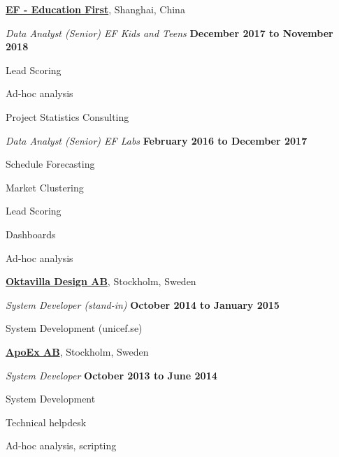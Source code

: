 \halfblankline

\href{http://www.ef.se}{\textbf{EF - Education First}}, Shanghai, China
\begin{outerlist}
\item[] \textit{Data Analyst (Senior) EF Kids and Teens}%
  \hfill \textbf{December 2017 to November 2018}
  \begin{innerlist}
  \item Lead Scoring
  \item Ad-hoc analysis
  \item Project Statistics Consulting
  \end{innerlist}

\item[] \textit{Data Analyst (Senior) EF Labs}%
  \hfill \textbf{February 2016 to December 2017}
  \begin{innerlist}
  \item Schedule Forecasting
  \item Market Clustering
  \item Lead Scoring
  \item Dashboards
  \item Ad-hoc analysis
  \end{innerlist}
\end{outerlist}

\halfblankline

\href{http://www.oktavilla.se}{\textbf{Oktavilla Design AB}}, Stockholm, Sweden
\begin{outerlist}
\item[] \textit{System Developer (stand-in)}%
  \hfill \textbf{October 2014 to January 2015}
  \begin{innerlist}
  \item System Development (unicef.se)
  \end{innerlist}
\end{outerlist}

\halfblankline

\href{http://www.apoex.se}{\textbf{ApoEx AB}}, Stockholm, Sweden
\begin{outerlist}
\item[] \textit{System Developer}%
  \hfill \textbf{October 2013 to June 2014}
  \begin{innerlist}
  \item System Development
  \item Technical helpdesk
  \item Ad-hoc analysis, scripting
  \end{innerlist}
\end{outerlist}

